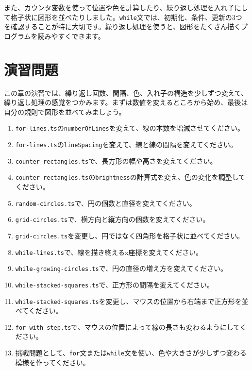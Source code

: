 また、カウンタ変数を使って位置や色を計算したり、繰り返し処理を入れ子にして格子状に図形を並べたりしました。\texttt{while}文では、初期化、条件、更新の3つを確認することが特に大切です。繰り返し処理を使うと、図形をたくさん描くプログラムを読みやすくできます。

\section{演習問題}

この章の演習では、繰り返し回数、間隔、色、入れ子の構造を少しずつ変えて、繰り返し処理の感覚をつかみます。まずは数値を変えるところから始め、最後は自分の規則で図形を並べてみましょう。

\begin{enumerate}
    \item \texttt{for-lines.ts}の\texttt{numberOfLines}を変えて、線の本数を増減させてください。
    \item \texttt{for-lines.ts}の\texttt{lineSpacing}を変えて、線と線の間隔を変えてください。
    \item \texttt{counter-rectangles.ts}で、長方形の幅や高さを変えてください。
    \item \texttt{counter-rectangles.ts}の\texttt{brightness}の計算式を変え、色の変化を調整してください。
    \item \texttt{random-circles.ts}で、円の個数と直径を変えてください。
    \item \texttt{grid-circles.ts}で、横方向と縦方向の個数を変えてください。
    \item \texttt{grid-circles.ts}を変更し、円ではなく四角形を格子状に並べてください。
    \item \texttt{while-lines.ts}で、線を描き終えるx座標を変えてください。
    \item \texttt{while-growing-circles.ts}で、円の直径の増え方を変えてください。
    \item \texttt{while-stacked-squares.ts}で、正方形の間隔を変えてください。
    \item \texttt{while-stacked-squares.ts}を変更し、マウスの位置から右端まで正方形を並べてください。
    \item \texttt{for-with-step.ts}で、マウスの位置によって線の長さも変わるようにしてください。
    \item 挑戦問題として、\texttt{for}文または\texttt{while}文を使い、色や大きさが少しずつ変わる模様を作ってください。
\end{enumerate}
